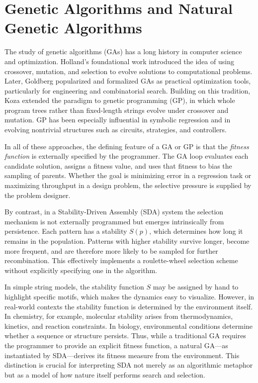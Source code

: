 \documentclass[life,article,submit,pdftex,moreauthors]{Definitions/mdpi}
\begin{document}
\section{Genetic Algorithms and Natural Genetic Algorithms}

The study of genetic algorithms (GAs) has a long history in computer science and optimization. 
Holland’s foundational work \cite{holland1975adaptation} introduced the idea of using crossover, 
mutation, and selection to evolve solutions to computational problems. Later, Goldberg 
\cite{goldberg1989genetic} popularized and formalized GAs as practical optimization tools, 
particularly for engineering and combinatorial search. Building on this tradition, Koza 
\cite{koza1992genetic} extended the paradigm to genetic programming (GP), in which whole 
program trees rather than fixed-length strings evolve under crossover and mutation. GP has 
been especially influential in symbolic regression and in evolving nontrivial structures such 
as circuits, strategies, and controllers.

In all of these approaches, the defining feature of a GA or GP is that the \emph{fitness function} 
is externally specified by the programmer. The GA loop evaluates each candidate solution, assigns 
a fitness value, and uses that fitness to bias the sampling of parents. Whether the goal is 
minimizing error in a regression task or maximizing throughput in a design problem, the selective 
pressure is supplied by the problem designer.


By contrast, in a Stability-Driven Assembly (SDA) system the selection mechanism is not externally 
programmed but emerges intrinsically from persistence. Each pattern has a stability $S(p)$, 
which determines how long it remains in the population. Patterns with higher stability survive 
longer, become more frequent, and are therefore more likely to be sampled for further 
recombination. This effectively implements a roulette-wheel selection scheme without explicitly 
specifying one in the algorithm.

In simple string models, the stability function $S$ may be assigned by hand to highlight specific 
motifs, which makes the dynamics easy to visualize. However, in real-world contexts the stability 
function is determined by the environment itself. In chemistry, for example, molecular stability 
arises from thermodynamics, kinetics, and reaction constraints. In biology, environmental conditions 
determine whether a sequence or structure persists. Thus, while a traditional GA requires the 
programmer to provide an explicit fitness function, a natural GA---as instantiated by SDA---derives 
its fitness measure from the environment. This distinction is crucial for interpreting SDA not 
merely as an algorithmic metaphor but as a model of how nature itself performs search and selection.
\end{document}
